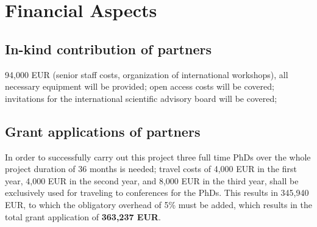 \documentclass[a4paper,11pt]{article}
\begin{document}
\section{Financial Aspects}
%

\subsection{In-kind contribution of partners}

94,000 EUR (senior staff costs, organization of international workshops), all necessary equipment will be provided; open access costs will be covered; invitations for the international scientific advisory board will be covered;
\\[0,2cm]

\subsection{Grant applications of partners}
In order to successfully carry out this project three full time PhDs over the whole project duration of 36 months is needed; travel costs of 4,000 EUR in the first year, 4,000 EUR in the second year, and 8,000 EUR in the third year, shall be exclusively used for traveling to conferences for the PhDs. This results in 345,940 EUR, to which the obligatory overhead of 5\% must be added, which results in the total grant application of \textbf{363,237 EUR}.
\\[0,2cm]
\end{document}
